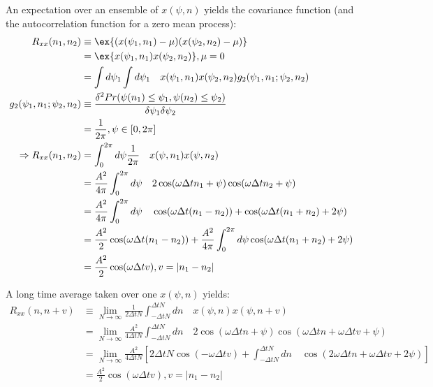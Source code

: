 An expectation over an ensemble of $x(\psi, n)$ yields the covariance function (and the autocorrelation function for a zero mean process):
\begin{align}
R_{xx}(n_1, n_2) &\equiv \ex{(x(\psi_1, n_1) - \mu )(x(\psi_2, n_2) - \mu )} \\
& = \ex{x(\psi_1, n_1) x(\psi_2, n_2)}, \mu = 0 \\
& = \int  d\psi_1  \int  d\psi_1  \quad x(\psi_1, n_1) x(\psi_2, n_2) g_2(\psi_1, n_1; \psi_2, n_2) \\
g_2(\psi_1, n_1; \psi_2, n_2) & \equiv \frac{\delta^2 Pr(\psi(n_1) \leq \psi_1, \psi(n_2) \leq \psi_2 )}{\delta \psi_1 \delta \psi_2} \\
& = \frac{1}{2\pi}, \psi \in [0, 2\pi] \label{eqn:SS_ensble_prob_density} \\
\Rightarrow R_{xx}(n_1, n_2) & = \int_0^{2\pi} d \psi \frac{1}{2\pi} \quad x(\psi, n_1) x(\psi, n_2) \\
& = \frac{A^2}{4\pi} \int_0^{2\pi} d \psi \quad 2\cos(\omega \Delta t n_1 + \psi) \cos(\omega \Delta t n_2 + \psi) \\
& = \frac{A^2}{4\pi} \int_0^{2\pi} d \psi \quad \cos(\omega \Delta t (n_1 -n_2))  + \cos(\omega \Delta t (n_1 + n_2) + 2\psi) \\
& = \frac{A^2}{2} \cos(\omega \Delta t (n_1 -n_2))  + \frac{A^2}{4 \pi}\int_0^{2\pi} d \psi  \cos(\omega \Delta t (n_1 + n_2) + 2\psi) \\
& = \frac{A^2}{2} \cos(\omega \Delta t v), v = |n_1 -n_2|
\end{align}

A long time average taken over one $x(\psi, n)$ yields:
\begin{align}
R_{xx}(n, n + v) & \equiv \lim_{N \to \infty} \frac{1}{2 \Delta t N} \int_{-\Delta t N}^{\Delta t N} dn \quad  x(\psi, n) x(\psi, n + v)  \\
& = \lim_{N \to \infty} \frac{A^2}{4 \Delta t N} \int_{-\Delta t N}^{\Delta t N} dn \quad 2 \cos(\omega \Delta t n + \psi) \cos(\omega \Delta t n + \omega \Delta t v + \psi) \\
& = \lim_{N \to \infty} \frac{A^2}{4 \Delta t N} [ 2\Delta t N\cos(-\omega \Delta t v)  + \int_{-\Delta t N}^{\Delta t N} dn \quad \cos(2\omega \Delta t n + \omega \Delta t v + 2\psi) ]\\
& =  \frac{A^2}{2} \cos(\omega \Delta t v), v = |n_1 -n_2| \\
\end{align}

